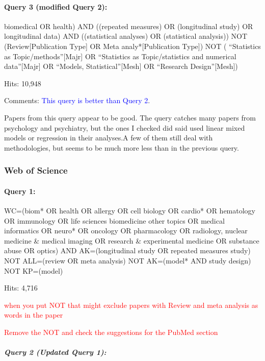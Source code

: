 \documentclass[
]{article}
\let\oldparagraph\paragraph
\renewcommand{\paragraph}[1]{\oldparagraph{#1}\mbox{}}
\let\oldsubparagraph\subparagraph
\renewcommand{\subparagraph}[1]{\oldsubparagraph{#1}\mbox{}}
\newcommand{\BN}[1]{\textcolor{red}{#1}}
\begin{document}
\hypertarget{query-3-modified-query-2}{%
\paragraph{Query 3 (modified Query 2):}\label{query-3-modified-query-2}}

biomedical OR health) AND ((repeated measures) OR (longitudinal study)
OR longitudinal data) AND ((statistical analyses) OR (statistical
analysis)) NOT (Review{[}Publication Type{]} OR Meta
analy*{[}Publication Type{]}) NOT ( ``Statistics as
Topic/methods''{[}Majr{]} OR ``Statistics as Topic/statistics and
numerical data''{[}Majr{]} OR ``Models, Statistical''{[}Mesh{]} OR
``Research Design''{[}Mesh{]})

Hits: 10,948

Comments: \textcolor{blue}{This query is better than Query 2}.

Papers from this query appear to be good. The query catches many papers
from psychology and psychiatry, but the ones I checked did said used
linear mixed models or regression in their analyses.A few of them still
deal with methodologies, but seems to be much more less than in the
previous query.

\hypertarget{web-of-science}{%
\subsubsection{Web of Science}\label{web-of-science}}

\hypertarget{query-1-1}{%
\paragraph{Query 1:}\label{query-1-1}}

WC=(biom* OR health OR allergy OR cell biology OR cardio* OR hematology
OR immunology OR life sciences biomedicine other topics OR medical
informatics OR neuro* OR oncology OR pharmacology OR radiology, nuclear
medicine \& medical imaging OR research \& experimental medicine OR
substance abuse OR optics) AND AK=(longitudinal study OR repeated
measures study) NOT ALL=(review OR meta analysis) NOT AK=(model* AND
study design) NOT KP=(model)

Hits: 4,716

\BN{when you put NOT that might exclude papers with Review and meta analysis as words in the paper}

\BN{Remove the NOT and check the suggestions for the PubMed section}

\hypertarget{query-2-updated-query-1}{%
\subparagraph{Query 2 (Updated Query
1):}\label{query-2-updated-query-1}}
\end{document}
